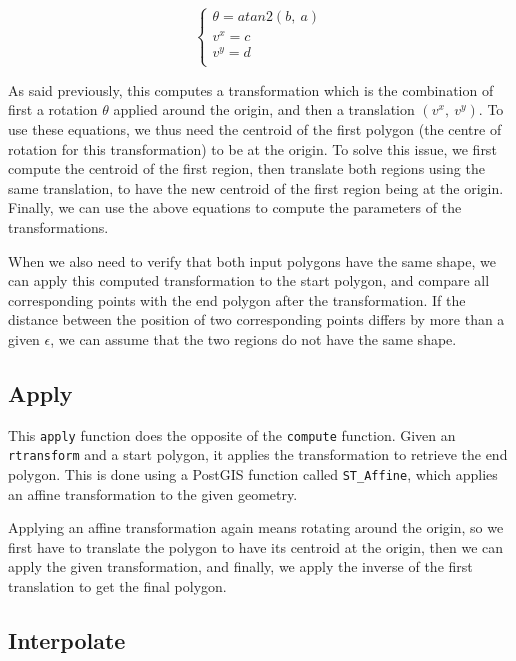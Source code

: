 \[
    \begin{cases}
        \theta = atan2(b,\ a) \\
        v^x = c \\
        v^y = d \\
    \end{cases}
\]

As said previously, this computes a transformation which is the combination of first a rotation $\theta$ applied around the origin, and then a translation $(v^x,\ v^y)$. To use these equations, we thus need the centroid of the first polygon (the centre of rotation for this transformation) to be at the origin. To solve this issue, we first compute the centroid of the first region, then translate both regions using the same translation, to have the new centroid of the first region being at the origin. Finally, we can use the above equations to compute the parameters of the transformations.

When we also need to verify that both input polygons have the same shape, we can apply this computed transformation to the start polygon, and compare all corresponding points with the end polygon after the transformation. If the distance between the position of two corresponding points differs by more than a given $\epsilon$, we can assume that the two regions do not have the same shape.

\subsection{Apply}
\label{section:apply}

This \lstinline{apply} function does the opposite of the \lstinline{compute} function. Given an \lstinline{rtransform} and a start polygon, it applies the transformation to retrieve the end polygon. This is done using a PostGIS function called \lstinline{ST_Affine}, which applies an affine transformation to the given geometry. 

Applying an affine transformation again means rotating around the origin, so we first have to translate the polygon to have its centroid at the origin, then we can apply the given transformation, and finally, we apply the inverse of the first translation to get the final polygon.

\subsection{Interpolate}
\label{section:interpolate}

